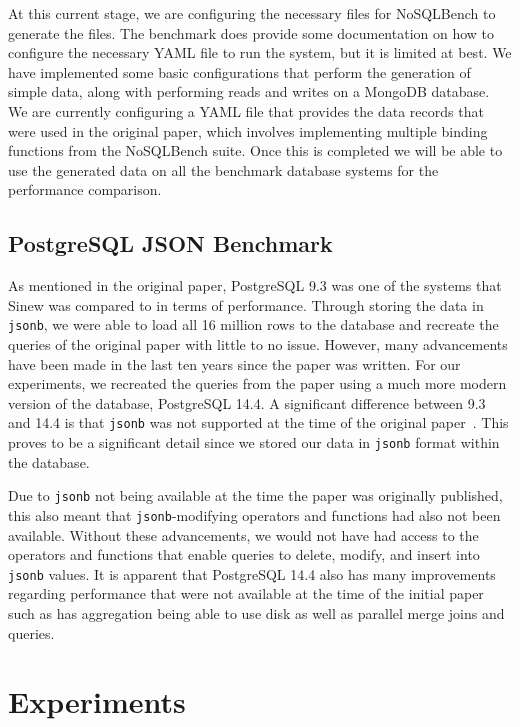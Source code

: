 \documentclass[sigconf]{acmart}
\begin{document}
    At this current stage, we are configuring the necessary files for NoSQLBench to generate the files. The benchmark does provide some documentation on how to configure the necessary YAML file to run the system, but it is limited at best. We have implemented some basic configurations that perform the generation of simple data, along with performing reads and writes on a MongoDB database. We are currently configuring a YAML file that provides the data records that were used in the original paper, which involves implementing multiple binding functions from the NoSQLBench suite. Once this is completed we will be able to use the generated data on all the benchmark database systems for the performance comparison.

       \subsection{PostgreSQL JSON Benchmark}
    As mentioned in the original paper, PostgreSQL 9.3 was one of the systems that Sinew was compared to in terms of performance. Through storing the data in \texttt{jsonb}, we were able to load all 16 million rows to the database and recreate the queries of the original paper with little to no issue. However, many advancements have been made in the last ten years since the paper was written. For our experiments, we recreated the queries from the paper using a much more modern version of the database, PostgreSQL 14.4. A significant difference between 9.3 and 14.4 is that \texttt{jsonb} was not supported at the time of the original paper~\cite{PostgtesVersions}. This proves to be a significant detail since we stored our data in \texttt{jsonb} format within the database. 

    Due to \texttt{jsonb} not being available at the time the paper was originally published, this also meant that \texttt{jsonb}-modifying operators and functions had also not been available. Without these advancements, we would not have had access to the operators and functions that enable queries to delete, modify, and insert into \texttt{jsonb} values. It is apparent that PostgreSQL 14.4 also has many improvements regarding performance that were not available at the time of the initial paper such as has aggregation being able to use disk as well as parallel merge joins and queries. 

\section{Experiments}
\end{document}
